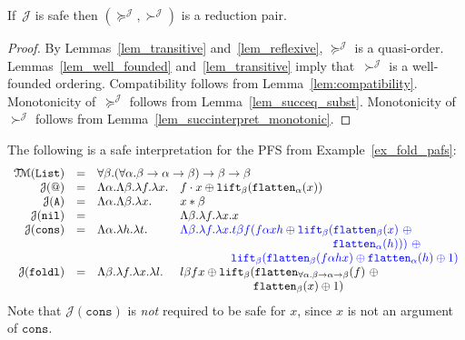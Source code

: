 \documentclass[a4paper,UKenglish,cleveref,autoref,numberwithinsect]{lipics-v2019}
\theoremstyle{definition}
\newcommand{\arrtype}{\rightarrow}
\newcommand{\quant}[2]{\forall #1.#2}
\newcommand{\abs}[2]{\lambda #1.#2}
\newcommand{\flatten}{\mathtt{flatten}}
\newcommand{\lift}{\mathtt{lift}}
\newcommand{\Typemap}{\mathcal{T\!M}}
\newcommand{\Termmap}{\mathcal{J}}
\newcommand{\succinterpret}{\succ^{\Termmap}}
\newcommand{\succeqinterpret}{\succeq^{\Termmap}}
\newcommand{\List}{\mathtt{List}}
\newcommand{\CKchange}[1]{\textcolor{blue}{#1}}
\begin{document}
\begin{theorem}\label{thm_reduction_pair}
  If~$\Termmap$ is safe then $(\succeqinterpret,\succinterpret)$ is a
  reduction pair.
\end{theorem}

\begin{proof}
  By Lemmas~\ref{lem_transitive} and~\ref{lem_reflexive},
  $\succeqinterpret$ is a
  quasi-order. Lemmas~\ref{lem_well_founded}
  and~\ref{lem_transitive} imply that~$\succinterpret$ is a
  well-founded ordering. Compatibility follows from
  Lemma~\ref{lem:compatibility}. Monotonicity of~$\succeqinterpret$
  follows from Lemma~\ref{lem_succeq_subst}. Monotonicity
  of~$\succinterpret$ follows from
  Lemma~\ref{lem_succinterpret_monotonic}.
\end{proof}

\begin{example}\label{ex_fold_interpretation}
  The following is a safe interpretation for the PFS from
  Example~\ref{ex_fold_pafs}:
  \[
  \begin{array}{rcll}
    \Typemap(\List) & = & \multicolumn{2}{l}{
      \quant{\beta}{(\quant{\alpha}{\beta \arrtype
      \alpha \arrtype \beta}) \arrtype \beta \arrtype \beta}}\\
  \Termmap(\mathtt{@}) & = & \Lambda \alpha.\Lambda\beta.
    \lambda f.\lambda x. &
    f \cdot x \oplus \lift_\beta(\flatten_\alpha(x)) \\
  \Termmap(\mathtt{A}) & = & \Lambda \alpha.\Lambda \beta.\lambda x. &
    x * \beta \\
  \Termmap(\mathtt{nil}) & = & & \Lambda \beta.\lambda f.\abs{x}{x} \\
  \Termmap(\mathtt{cons}) & = & \Lambda \alpha.\lambda h.\lambda t. &
    \CKchange{\Lambda \beta.\lambda f.\lambda x.
    t \beta f (f \alpha x h \oplus \lift_\beta(\flatten_\beta(x)\ 
    \oplus} \\
    & & & \phantom{ABCDEFGHIJKLMNOP,} \CKchange{\flatten_\alpha(h)))\ \oplus}\  \\
    & & & \phantom{ABCDE\ }
    \CKchange{\lift_\beta(\flatten_\beta(f\alpha h x) \oplus
    \flatten_\alpha(h) \oplus 1)} \\
  \Termmap(\mathtt{foldl}) & = & \Lambda \beta.\lambda f. \lambda x.
    \lambda l. & l \beta f x \oplus \lift_\beta(\flatten_{\forall \alpha.
    \beta \arrtype \alpha \arrtype \beta}(f)\ \oplus \\
    & & & \phantom{ABCDEFG\ \ }
    \flatten_\beta(x) \oplus 1) \\
  \end{array}
  \]
Note that $\Termmap(\mathtt{cons})$ is \emph{not} required to be safe
for $x$, since $x$ is not an argument of $\mathtt{cons}$.
\end{example}
\end{document}
